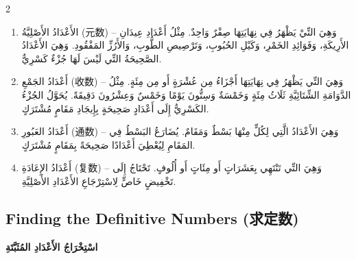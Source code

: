 \documentclass[11pt,a4paper]{article}
\newcommand{\ar}[1]{\arabicfont\beginR #1\endR}
\newcommand{\zhtext}[1]{{\chinese #1}}
\newenvironment{bilingual}{%
  \begin{paracol}{2}
}{%
  \end{paracol}
}
\begin{document}
\begin{bilingual}
\begin{rightcolumn*}
\begin{enumerate}[label=\arabic*.]
  \item \ar{الأَعْدَادُ الأَصْلِيَّةُ (元数) -- وَهِيَ التِّيْ يَظْهَرُ فِي نِهَايَتِهَا صِفْرٌ وَاحِدٌ. مِثْلُ أَعْدَادِ عِيدَانِ الأَرِيكَةِ، وَفَوَائِدِ الخَمْرِ، وَكَيْلِ الحُبُوبِ، وَتَرْصِيصِ الطُّوبِ، وَالأَرُزِّ المَفْقُودِ. وَهِيَ الأَعْدَادُ الصَّحِيحَةُ التِّي لَيْسَ لَهَا جُزْءٌ كَسْرِيٌّ.}
  \item \ar{أَعْدَادُ الجَمْعِ (收数) -- وَهِيَ التِّي يَظْهَرُ فِي نِهَايَتِهَا أَجْزَاءُ مِن عُشْرَةٍ أَو مِن مِئَةٍ. مِثْلُ الدَّوَامَةِ الشِّتَائِيَّةِ ثَلَاثُ مِئَةٍ وَخَمْسَةٌ وَسِتُّونَ يَوْمًا وَخَمْسٌ وَعِشْرُونَ دَقِيقَةً. يُحَوَّلُ الجُزْءُ الكَسْرِيُّ إِلَى أَعْدَادٍ صَحِيحَةٍ بِإِيجَادِ مَقَامٍ مُشْتَرَكٍ.}
  \item \ar{أَعْدَادُ العَبُورِ (通数) -- وَهِيَ الأَعْدَادُ الَّتِي لِكُلٍّ مِنْهَا بَسْطٌ وَمَقَامٌ. يُضَارَعُ البَسْطُ فِي المَقَامِ لِيُعْطِيَ أَعْدَادًا صَحِيحَةً بِمَقَامٍ مُشْتَرَكٍ.}
  \item \ar{أَعْدَادُ الإِعَادَةِ (复数) -- وَهِيَ التِّي تَنْتَهِي بِعَشَرَاتٍ أَو مِئَاتٍ أَو أُلُوفٍ. تَحْتَاجُ إِلَى تَخْفِيضٍ خَاصٍّ لِاسْتِرْجَاعِ الأَعْدَادِ الأَصْلِيَّةِ.}
\end{enumerate}
\end{rightcolumn*}

\end{bilingual}

\newpage

\subsection{Finding the Definitive Numbers (\zhtext{求定数})}
\ar{\textbf{اسْتِخْرَاجُ الأَعْدَادِ المُثَبَّتَةِ}}
\end{document}
